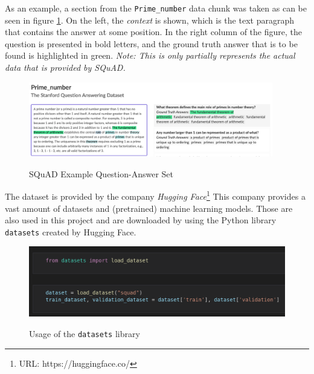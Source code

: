             As an example, a section from the \texttt{Prime\_number} data chunk was taken as can be seen in figure \ref{fig:-squad-example}. On the left, the \emph{context} is shown, which is the text paragraph that contains the answer at some position.
            In the right column of the figure, the question is presented in bold letters, and the ground truth answer that is to be found is highlighted in green. \emph{Note: This is only partially represents the actual data that is provided by SQuAD.}

            \begin{figure}[h!]
                \centering
                \caption{SQuAD Example Question-Answer Set\cite{squadExample}}
                \includegraphics[width=0.95\textwidth]{figures/squad_example.png}
                \label{fig:-squad-example}
            \end{figure}

            The dataset is provided by the company \emph{Hugging Face}\footnote{URL: https://huggingface.co/}
            This company provides a vast amount of datasets and (pretrained) machine learning models. 
            Those are also used in this project and are downloaded by using the Python library \texttt{datasets} created by Hugging Face.

            \begin{figure}
                \centering
                \caption{Usage of the \texttt{datasets} library\cite[\texttt{data\_properties.ipynb}]{innerProject}}
                \includegraphics[scale=0.8]{figures/datasets_library.png}
                \label{fig:-datasets-library}
            \end{figure}

